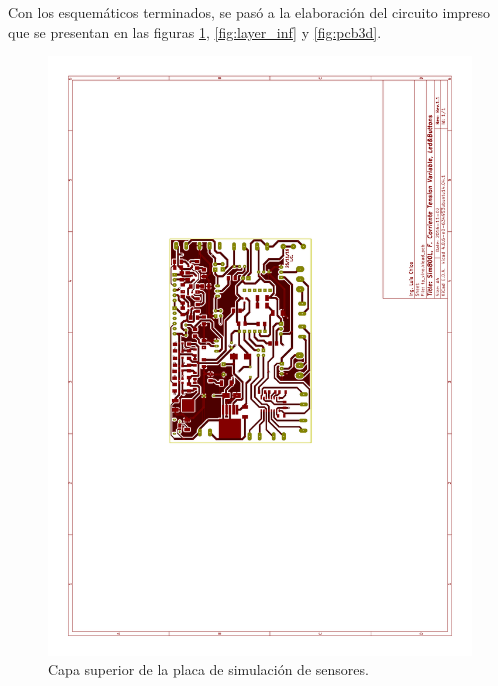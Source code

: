 Con los esquemáticos terminados, se pasó a la elaboración del circuito impreso que se presentan en las figuras \ref{fig:layer_sup}, \ref{fig:layer_inf} y \ref{fig:pcb3d}.
\begin{figure}[!hp]
  \centering
  \includegraphics[page=1,angle=270,clip,trim=5.5cm 10cm 7.7cm 8.5cm]{./Figures/pcb_layer.pdf}
  \caption{Capa superior de la placa de simulación de sensores.}
  \label{fig:layer_sup}
\end{figure}
